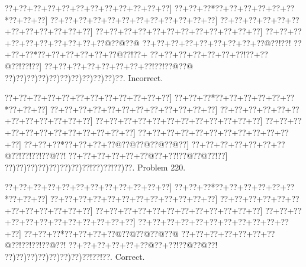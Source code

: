 \documentclass[a5paper]{article}
\begin{document}
\begin{center}
{\goo
\0??+\0??+\0??+\0??+\0??+\0??+\0??+\0??+\0??+\0??+\0??+\0??]
\0??+\0??+\0??*\0??+\0??+\0??+\0??+\0??+\0??*\0??+\0??+\0??]
\0??+\0??+\0??+\0??+\0??+\0??+\0??+\0??+\0??+\0??+\0??+\0??]
\0??+\0??+\0??+\0??+\0??+\0??+\0??+\0??+\0??+\0??+\0??+\0??]
\0??+\0??+\0??+\0??+\0??+\0??+\0??+\0??+\0??+\0??+\0??+\0??]
\0??+\0??+\0??+\0??+\0??+\0??+\0??+\0??+\0??+\0??@\0??@\0??@
\0??+\0??+\0??+\0??+\0??+\0??+\0??+\0??+\0??@\0??!\0??!
\0??+\0??+\0??*\0??+\0??+\0??+\0??+\0??+\0??@\0??!\0??+
\0??+\0??+\0??+\0??+\0??+\0??+\0??!\0??+\0??@\0??!\0??!\0??]
\0??+\0??+\0??+\0??+\0??+\0??+\0??+\0??!\0??!\0??@\0??@
\0??)\0??)\0??)\0??)\0??)\0??)\0??)\0??)\0??)\0??)\0??.
}
Incorrect. 

\end{center}
\newpage
\begin{center}
{\goo
\0??+\0??+\0??+\0??+\0??+\0??+\0??+\0??+\0??+\0??+\0??+\0??]
\0??+\0??+\0??*\0??+\0??+\0??+\0??+\0??+\0??*\0??+\0??+\0??]
\0??+\0??+\0??+\0??+\0??+\0??+\0??+\0??+\0??+\0??+\0??+\0??]
\0??+\0??+\0??+\0??+\0??+\0??+\0??+\0??+\0??+\0??+\0??+\0??]
\0??+\0??+\0??+\0??+\0??+\0??+\0??+\0??+\0??+\0??+\0??+\0??]
\0??+\0??+\0??+\0??+\0??+\0??+\0??+\0??+\0??+\0??+\0??+\0??]
\0??+\0??+\0??+\0??+\0??+\0??+\0??+\0??+\0??+\0??+\0??+\0??]
\0??+\0??+\0??*\0??+\0??+\0??+\0??@\0??@\0??@\0??@\0??@\0??]
\0??+\0??+\0??+\0??+\0??+\0??+\0??@\0??!\0??!\0??!\0??@\0??!
\0??+\0??+\0??+\0??+\0??+\0??@\0??+\0??!\0??@\0??@\0??!\0??]
\0??)\0??)\0??)\0??)\0??)\0??)\0??)\0??!\0??)\0??!\0??)\0??.
}
Problem 220.

\end{center}
\begin{center}
{\goo
\0??+\0??+\0??+\0??+\0??+\0??+\0??+\0??+\0??+\0??+\0??+\0??]
\0??+\0??+\0??*\0??+\0??+\0??+\0??+\0??+\0??*\0??+\0??+\0??]
\0??+\0??+\0??+\0??+\0??+\0??+\0??+\0??+\0??+\0??+\0??+\0??]
\0??+\0??+\0??+\0??+\0??+\0??+\0??+\0??+\0??+\0??+\0??+\0??]
\0??+\0??+\0??+\0??+\0??+\0??+\0??+\0??+\0??+\0??+\0??+\0??]
\0??+\0??+\0??+\0??+\0??+\0??+\0??+\0??+\0??+\0??+\0??+\0??]
\0??+\0??+\0??+\0??+\0??+\0??+\0??+\0??+\0??+\0??+\0??+\0??]
\0??+\0??+\0??*\0??+\0??+\0??+\0??@\0??@\0??@\0??@\0??@
\0??+\0??+\0??+\0??+\0??+\0??+\0??@\0??!\0??!\0??!\0??@\0??!
\0??+\0??+\0??+\0??+\0??+\0??@\0??+\0??!\0??@\0??@\0??!
\0??)\0??)\0??)\0??)\0??)\0??)\0??)\0??!\0??!\0??.
}
Correct. 

\end{center}
\end{document}
